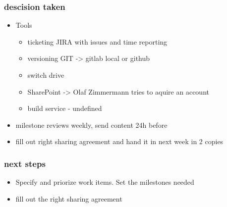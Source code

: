 \subsubsection{descision taken}

\begin{itemize}
    \item Tools
        \begin{itemize}
            \item ticketing JIRA with issues and time reporting 
            \item versioning GIT -> gitlab local or github
            \item switch drive
            \item SharePoint -> Olaf Zimmermann tries to aquire an account
            \item build service - undefined
        \end{itemize}
    \item milestone reviews weekly, send content 24h before
    \item fill out right sharing agreement and hand it in next week in 2 copies
\end{itemize}

\subsubsection{next steps}
\begin{itemize}
    \item Specify and priorize work items. Set the milestones needed
    \item fill out the right sharing agreement
\end{itemize}